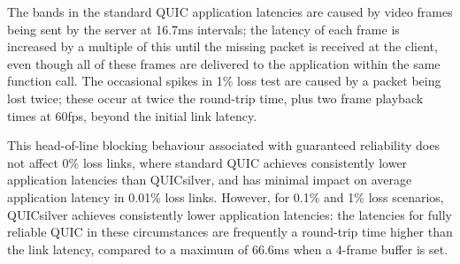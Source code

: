 \documentclass{mpaper}
\begin{document}
The bands in the standard QUIC application latencies are caused by video frames being sent by the server at 16.7ms intervals; the latency of each frame is increased by a multiple of this until the missing packet is received at the client, even though all of these frames are delivered to the application within the same function call. The occasional spikes in 1\% loss test are caused by a packet being lost twice; these occur at twice the round-trip time, plus two frame playback times at 60fps, beyond the initial link latency.


This head-of-line blocking behaviour associated with guaranteed reliability does not affect 0\% loss links, where standard QUIC achieves consistently lower application latencies than QUICsilver, and has minimal impact on average application latency in 0.01\% loss links. However, for 0.1\% and 1\% loss scenarios, QUICsilver achieves consistently lower application latencies: the latencies for fully reliable QUIC in these circumstances are frequently a round-trip time higher than the link latency, compared to a maximum of 66.6ms when a 4-frame buffer is set.

\clearpage
\end{document}
